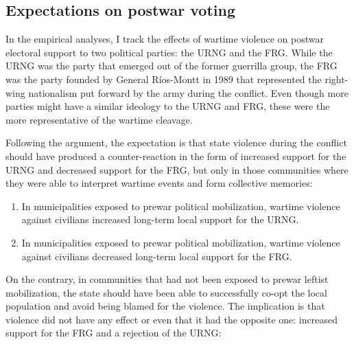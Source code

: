 \documentclass[12pt, notitlepage]{article}
\begin{document}

\subsection*{Expectations on postwar voting}


In the empirical analyses, I track the effects of wartime violence on postwar electoral support to two political parties: the URNG and the FRG.
While the URNG was the party that emerged out of the former guerrilla group, the FRG was the party founded by General Ríos-Montt in 1989 that represented the right-wing nationalism put forward by the army during the conflict.
Even though more parties might have a similar ideology to the URNG and FRG, these were the more representative of the wartime cleavage.

Following the argument, the expectation is that state violence during the conflict should have produced a counter-reaction in the form of increased support for the URNG and decreased support for the FRG, but only in those communities where they were able to interpret wartime events and form collective memories:

\begin{enumerate}[label={\bf H\arabic*:} , ref=H\arabic* , wide=0.5em, leftmargin=*]
  \item \label{h:URNG-mob} In municipalities exposed to prewar political mobilization, wartime violence against civilians increased long-term local support for the URNG.
  \item \label{h:FRG-mob} In municipalities exposed to prewar political mobilization, wartime violence against civilians decreased long-term local support for the FRG.
\end{enumerate}

On the contrary, in communities that had not been exposed to prewar leftist mobilization, the state should have been able to successfully co-opt the local population and avoid being blamed for the violence.
The implication is that violence did not have any effect or even that it had the opposite one: increased support for the FRG and a rejection of the URNG:
\end{document}
